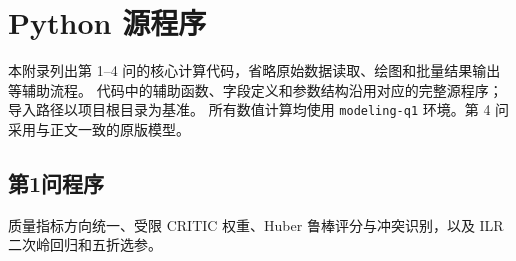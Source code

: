 \documentclass[bwprint]{gmcmthesis}
\numberwithin{equation}{section}
\numberwithin{figure}{section}
\numberwithin{table}{section}
\begin{document}
    

\clearpage
\section{Python 源程序}    %
\renewcommand{\thesubsection}{A\thinskip.\thinskip\arabic{subsection}}
\setcounter{subsection}{0}

\begingroup
{}

本附录列出第 1--4 问的核心计算代码，省略原始数据读取、绘图和批量结果输出等辅助流程。
代码中的辅助函数、字段定义和参数结构沿用对应的完整源程序；导入路径以项目根目录为基准。
所有数值计算均使用 \texttt{modeling-q1} 环境。第 4 问采用与正文一致的原版模型。

\subsection{第1问程序}  %
质量指标方向统一、受限 CRITIC 权重、Huber 鲁棒评分与冲突识别，以及 ILR 二次岭回归和五折选参。
\end{document}
